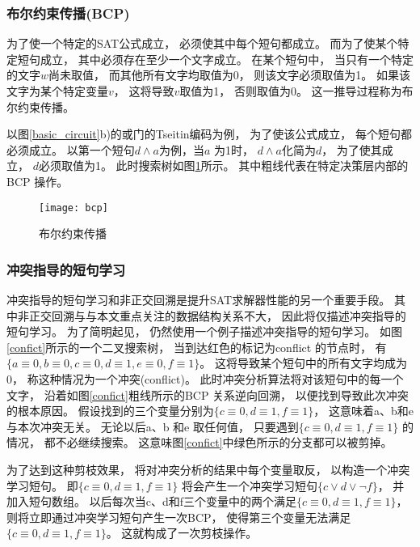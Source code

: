 \subsubsection{布尔约束传播(BCP)}
为了使一个特定的SAT公式成立，
必须使其中每个短句都成立。
而为了使某个特定短句成立，
其中必须存在至少一个文字成立。
在某个短句中，
当只有一个特定的文字$w$尚未取值，
而其他所有文字均取值为0，
则该文字必须取值为1。
如果该文字为某个特定变量$v$，
这将导致$v$取值为1，
否则取值为0。
这一推导过程称为布尔约束传播。

以图\ref{basic_circuit}b)的或门的Tseitin编码为例，
为了使该公式成立，
每个短句都必须成立。
以第一个短句$d \wedge a$为例，当$a$ 为1时，
$d \wedge a$化简为$d$，
为了使其成立，
$d$必须取值为1。
此时搜索树如图\ref{BCP}所示。
其中粗线代表在特定决策层内部的BCP 操作。

\begin{figure}[t] %
  \centering
  \texttt{[image: bcp]}
  \caption{布尔约束传播}
  \label{BCP}
\end{figure}

\subsubsection{冲突指导的短句学习}
冲突指导的短句学习和非正交回溯是提升SAT求解器性能的另一个重要手段。
其中非正交回溯与与本文重点关注的数据结构关系不大，
因此将仅描述冲突指导的短句学习。
为了简明起见，
仍然使用一个例子描述冲突指导的短句学习。
如图\ref{confict}所示的一个二叉搜索树，
当到达红色的标记为conflict 的节点时，
有$\{a \equiv 0,b \equiv 0, c \equiv 0,d \equiv1,e \equiv 0,f \equiv1\}$。
这将导致某个短句中的所有文字均成为0，
称这种情况为一个冲突(conflict)。
此时冲突分析算法将对该短句中的每一个文字，
沿着如图\ref{confict}粗线所示的BCP 关系逆向回溯，
以便找到导致此次冲突的根本原因。
假设找到的三个变量分别为$\{c \equiv 0,d \equiv 1,f \equiv 1\}$，
这意味着a、b和e与本次冲突无关。
无论以后a、b 和e 取任何值，
只要遇到$\{c \equiv 0,d \equiv 1,f \equiv 1\}$ 的情况，
都不必继续搜索。
这意味图\ref{confict}中绿色所示的分支都可以被剪掉。

为了达到这种剪枝效果，
将对冲突分析的结果中每个变量取反，
以构造一个冲突学习短句。
即$\{c \equiv 0, d \equiv 1, f \equiv 1\}$ 将会产生一个冲突学习短句$\{c\vee d \vee \neg f\}$，
并加入短句数组。
以后每次当c、d和f三个变量中的两个满足$\{c \equiv 0, d \equiv 1, f \equiv 1\}$，
则将立即通过冲突学习短句产生一次BCP，
使得第三个变量无法满足$\{c \equiv 0,d \equiv 1,f \equiv 1\}$。
这就构成了一次剪枝操作。

